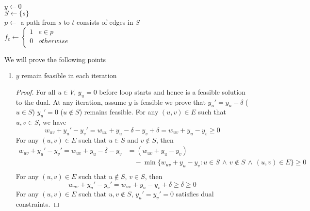\documentclass[11pt]{article}
\begin{document}
\begin{enumerate}
\begin{algorithm}[H]
    $y\leftarrow 0$ \\
    $S \leftarrow \{s\}$ \\ 
    $ p \leftarrow$ a path from $s$ to $t$ consists of edges in $S$ \\
    $ f_e \leftarrow 
    \begin{cases}
        1 &  e \in p \\
        0 & otherwise \\ 
    \end{cases} $\\ 
\end{algorithm} 

\newpage

We will prove the following points 
\begin{enumerate}
\item $y$ remain feasible in each iteration 
\begin{proof}
    For all $u\in V$, $y_u = 0$ before loop starts and hence is a feasible solution to the dual. At any iteration, assume $y$ is feasible we prove that $y_u' = y_u - \delta$ ($u\in S$) $y_u' = 0$ ($u\not\in S$) remains feasible. For any $(u,v)\in E$ such that $u,v\in S$, we have 
    \[
        w_{uv} + y_u' - y_v'  = w_{uv} + y_u - \delta - y_v + \delta = w_{uv} + y_u - y_v \geq 0 
    \]
    For any $(u,v)\in E$ such that $u\in S$ and $v\not\in S$, then 
    \begin{align*}
        w_{uv} + y_u' - y_v' = 
        w_{uv} + y_u - \delta - y_v 
        &= (w_{uv} + y_u  - y_v)  \\
        & \quad - \min \{ w_{uv} + y_u - y_v : u\in S \,\land\, v\not\in S \,\land\, (u,v) \in E \} \geq 0 \\ 
    \end{align*}
    For any $(u,v)\in E$ such that $u\not\in S$, $v\in S$, then 
    \[
        w_{uv} + y_u' - y_v' = w_{uv} + y_u - y_v + \delta \geq \delta \geq 0
    \]
    For any $(u,v)\in E$ such that $u,v\not\in S$, $y_u' = y_v' = 0$ satisfies dual constraints. 
\end{proof}



\end{enumerate}
\end{enumerate}
\end{document}

